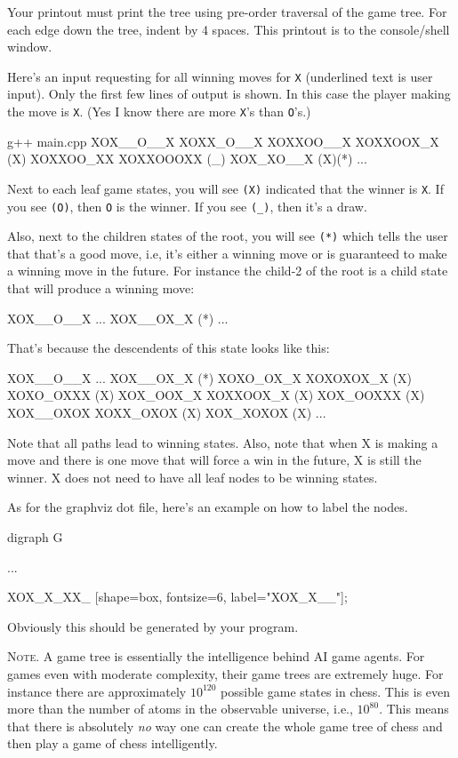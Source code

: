Your printout must print the tree using
pre-order traversal of the game tree.
For each edge down the tree, indent by 4 spaces.
This printout is to the console/shell window.

Here's an input requesting for all winning moves for \verb!X!
(underlined text is user input).
Only the first few lines of output is shown.
In this case the player making the move is \verb!X!.
(Yes I know there are more \verb!X!'s than \verb!O!'s.)
\begin{console}[commandchars=\\\{\},fontsize=\small]
g++ main.cpp
XOX__O__X
    XOXX_O__X
        XOXXOO__X
            XOXXOOX_X (X)
            XOXXOO_XX
                XOXXOOOXX (_)
    XOX_XO__X (X)(*)
    ...
\end{console}
Next to each leaf game states, you will see \verb!(X)!
indicated that the winner is \verb!X!.
If you see \verb!(O)!, then \verb!O! is the winner.
If you see \verb!(_)!, then it's a draw.

Also, next to the children states of the root, you will see \verb!(*)!
which tells the user that that's a good move, i.e,
it's either a winning move or is guaranteed to make a winning move
in the future.
For instance the child-2 of the root is a child state
that will produce a winning move:
\begin{console}[commandchars=\\\{\},fontsize=\footnotesize]
XOX__O__X
    ...
    XOX__OX_X (*)
    ...
\end{console}
That's because the descendents of this state looks like this:
  \begin{console}[commandchars=\\\{\},fontsize=\footnotesize]
XOX__O__X
    ...
    XOX__OX_X (*)
        XOXO_OX_X
            XOXOXOX_X (X)
            XOXO_OXXX (X)
        XOX_OOX_X
            XOXXOOX_X (X)
            XOX_OOXXX (X)
        XOX__OXOX
            XOXX_OXOX (X)
            XOX_XOXOX (X)
    ...
\end{console}
Note that all paths lead to winning states.
Also, note that when X is making a move and there is one move that
will force a win in the future, X is still the winner.
X does not need to have all leaf nodes to be winning states.


As for the graphviz dot file, here's an example on how to label the nodes.
{\footnotesize
\begin{console}
digraph G
{
   ...
   
   XOX_X_XX_ [shape=box, fontsize=6, label="XOX\n_X_\nXX_"];
}
\end{console}
}
Obviously this should be generated by your program.

\textsc{Note.}
A game tree is essentially the intelligence
behind AI game agents.
For games even with moderate complexity,
their game trees are extremely huge.
For instance there are approximately $10^{120}$ possible game states in chess.
This is even more than the number of
atoms in the observable universe, i.e., $10^{80}$.
This means that there is absolutely \textit{no} 
way one can create the whole game tree
of chess and then play a game of chess intelligently.
